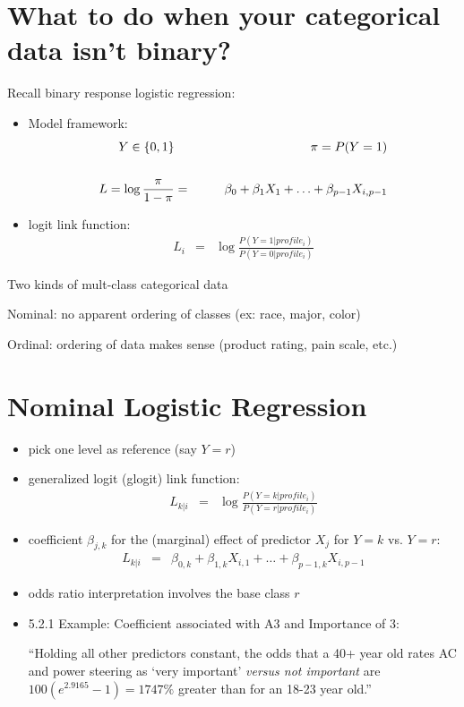 \documentclass[12pt]{notes}
\begin{document}

\section{What to do when your categorical data isn't binary?}

Recall binary response logistic regression:
\begin{itemize}
  \item Model framework:
    \begin{eqnarray}
      Y \in \{0 , 1\}  & \mbox{\hspace{3em}} &  \pi =  P(Y=1) \nonumber \\
      & \nonumber \\
      L = \log \frac{\pi}{1-\pi} & = & \beta_0 + \beta_1 X_1 + \ldots + \beta_{p-1} X_{i,p-1} \nonumber
    \end{eqnarray}
  \item logit link function:\\ \vspace{-1em}
\begin{eqnarray}
  L_i & = & \log \frac{P(Y = 1 | profile_i)}{ P(Y=0 | profile_i)} \nonumber
\end{eqnarray}
\end{itemize}

Two kinds of mult-class categorical data
\bi
\item Nominal: no apparent ordering of classes (ex: race, major, color) 
\item Ordinal: ordering of data makes sense (product rating, pain scale, etc.)
\ei

\section{Nominal Logistic Regression}
\begin{itemize}
  \item pick one level as reference (say $Y=r$)
  \item generalized logit (glogit) link function:
    \begin{eqnarray}
      L_{k|i} & = & \log \frac{P(Y = k | profile_i)}{ P(Y=r | profile_i)} \nonumber
    \end{eqnarray}
  \item coefficient $\beta_{j,k}$ for the (marginal) effect of predictor $X_j$ for $Y=k$ vs. $Y=r$:
      \begin{eqnarray}
        L_{k|i} & = & \beta_{0,k} + \beta_{1,k} X_{i,1} + \ldots + \beta_{p-1,k} X_{i,p-1} \nonumber
      \end{eqnarray}
  \item odds ratio interpretation involves the base class $r$
  \bi
  \item 5.2.1 Example: Coefficient associated with A3 and Importance of 3: 
  
  ``Holding all other predictors constant, the odds that a 40+ year old rates AC and power steering as `very important' \textit{versus not important} are $100(e^{2.9165} - 1) = 1747\%$ greater than for an 18-23 year old.''
  \ei
\end{itemize}
\end{document}
